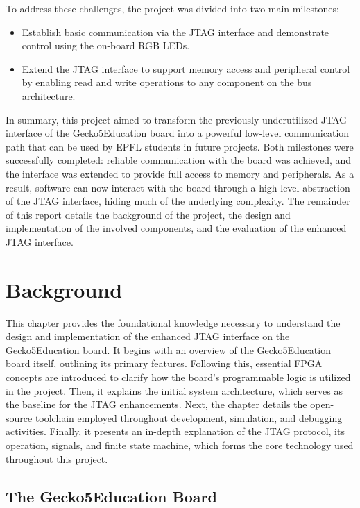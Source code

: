 \documentclass[a4paper,11pt,oneside]{report}
\newcommand{\boardName}{Gecko5Education \xspace}
\begin{document}
To address these challenges, the project was divided into two main milestones:

\begin{itemize}
    \item Establish basic communication via the JTAG interface and demonstrate control using the on-board RGB LEDs.
    \item Extend the JTAG interface to support memory access and peripheral control by enabling read and write operations to any component on the bus architecture.
\end{itemize}

In summary, this project aimed to transform the previously underutilized JTAG interface of the \boardName board into a powerful low-level communication path 
that can be used by EPFL students in future projects.
Both milestones were successfully completed: reliable communication with the board was achieved, 
and the interface was extended to provide full access to memory and peripherals.
As a result, software can now interact with the board through a high-level abstraction of the JTAG interface, 
hiding much of the underlying complexity.
The remainder of this report details the background of the project, the design and implementation of the involved components, and the evaluation of the enhanced JTAG interface.


\chapter{Background}

This chapter provides the foundational knowledge necessary to understand the design and implementation of the enhanced JTAG interface on the \boardName board.
It begins with an overview of the \boardName board itself, outlining its primary features.
Following this, essential FPGA concepts are introduced to clarify how the board’s programmable logic is utilized in the project.
Then, it explains the initial system architecture, which serves as the baseline for the JTAG enhancements.
Next, the chapter details the open-source toolchain employed throughout development, simulation, and debugging activities.
Finally, it presents an in-depth explanation of the JTAG protocol, its operation, signals, and finite state machine, which forms the core technology used throughout this project.

\section{The \boardName Board}
\label{sec:board}
\end{document}
